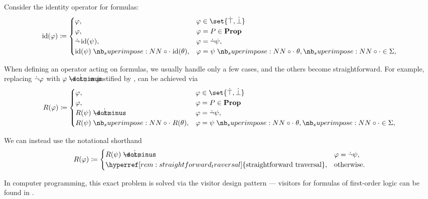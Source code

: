 \begin{remark}\label{rem:straightforward_traversal}
  Consider the identity operator for formulas:
  \begin{equation*}
    \begin{aligned}
      \id(\varphi) \coloneqq \begin{cases}
        \varphi,                        &\varphi \in \set{ \syntop, \synbot } \\
        \varphi,                        &\varphi = P \in \boldop{Prop} \\
        \synneg \id(\psi),              &\varphi = \synneg \psi, \\
        \id(\psi) \syncirc \id(\theta), &\varphi = \psi \syncirc \theta, {\syncirc} \in \Sigma, \\
      \end{cases}
    \end{aligned}
  \end{equation*}

  When defining an operator acting on formulas, we usually handle only a few cases, and the others become straightforward. For example, replacing \( \dot\neg \varphi \) with \( \varphi \synimplies \synbot \), as justified by , can be achieved via
  \begin{equation*}
    \begin{aligned}
      R(\varphi) \coloneqq \begin{cases}
        \varphi,                     &\varphi \in \set{ \syntop, \synbot } \\
        \varphi,                     &\varphi = P \in \boldop{Prop} \\
        R(\psi) \synimplies \synbot, &\varphi = \synneg \psi, \\
        R(\psi) \syncirc R(\theta),  &\varphi = \psi \syncirc \theta, {\syncirc} \in \Sigma, \\
      \end{cases}
    \end{aligned}
  \end{equation*}

  We can instead use the notational shorthand
  \begin{equation*}
    \begin{aligned}
      R(\varphi) \coloneqq \begin{cases}
        R(\psi) \synimplies \synbot,                                             &\varphi = \synneg \psi, \\
        \hyperref[rem:straightforward_traversal]{\T{straightforward traversal}}, &\T{otherwise.}
      \end{cases}
    \end{aligned}
  \end{equation*}

  In computer programming, this exact problem is solved via the visitor design pattern --- visitors for formulas of first-order logic can be found in \cite{code}.
\end{remark}

